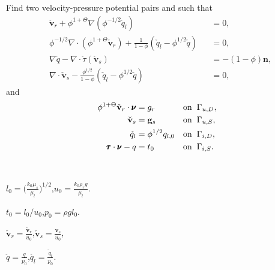 \documentclass[usenames,dvipsnames,letterpaper,landscape,final]{slides}
\begin{document}
\begin{myslide}
Find two velocity-pressure potential pairs  and 
 such that 
\begin{equation*}
\begin{alignedat}{2}
		  &\check{\mathbf{v}}_r
		  + \phi^{1+\Theta}\nabla(\phi^{-1/2}\check{q}_l)
        &&= 0,\\
		  &\phi^{-1/2}\nabla \cdot(\phi^{1+\Theta}\check{\mathbf{v}}_r)
        + \frac{1}{1-\phi}(\check{q}_l - \phi^{1/2}\check{q}) &&=0,\\
		  &\nabla \check{q} - \nabla \cdot \check{\tau}(\check{\mathbf{v}}_s) &&= -(1-\phi)\mathbf{n},\\
		  &\nabla \cdot \check{\mathbf{v}}_s
        - \frac{\phi^{1/2}}{1-\phi}(\check{q}_l - \phi^{1/2}\check{q}) &&=0,
\end{alignedat}
\end{equation*}
and
\begin{equation*}\label{eq:bv}
		  \begin{alignedat}{2}
					 \phi^{1+\Theta}\check{\mathbf{v}}_r\cdot \pmb{\nu} &= g_{r} \quad &&\text{on} \hspace{0.2cm} \Gamma_{u,D}, \\
					 \check{\mathbf{v}}_s &= \mathbf{g}_{s} \quad &&\text{on} \hspace{0.2cm} \Gamma_{u,S}, \\
					 \check{q}_l &= \phi^{1/2}q_{l,0} \quad &&\text{on} \hspace{0.2cm} \Gamma_{i,D}, \\
					 \pmb{\tau}\cdot \pmb{\nu} - q &= t_0  \quad &&\text{on} \hspace{0.2cm} \Gamma_{i,S}.
		  \end{alignedat}
\end{equation*}

\parbox{0.5\textwidth}{\raggedright
{}\\
\begin{blist}
\item $l_0 = \Big( \frac{k_0 \mu_s}{\mu_l} \Big)^{1/2}$,\quad $u_0 = \frac{k_0 \rho_r g}{\mu_l}$.
\item $t_0 = l_0/u_0$,\quad $p_0 = \rho g l_0$.
\end{blist}
}\parbox{0.5\textwidth}{\raggedright
{}
\begin{blist}
\item $\check{\mathbf{v}}_r = \frac{\tilde{\mathbf{v}}_r}{u_0}$,\quad $\check{\mathbf{v}}_s = \frac{\mathbf{v}_s}{u_0}$, 
\item $\check{q} = \frac{q}{p_0}$,\quad $\check{q_l} = \frac{\tilde{q}_l}{p_0}$.
\end{blist}
}

\end{myslide}
\end{document}
